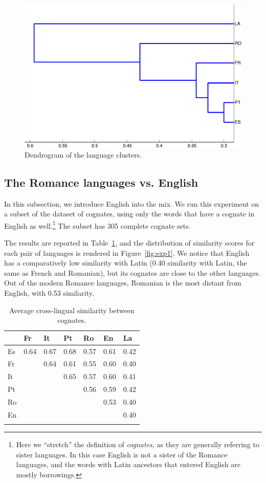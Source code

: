 \documentclass[output=paper]{langsci/langscibook}
\begin{document}
\begin{figure}[p]
\center
\includegraphics[width=0.8\linewidth]{figures/UBAN_dendrogram.pdf}
\caption{\label{fig:dendrogram_cognates}Dendrogram of the language clusters.}
\end{figure}

\subsection{The Romance languages vs. English}\largerpage

In this subsection, we introduce English into the mix. We run this experiment on a subset of the dataset of cognates, using only the words that have a cognate in English as well.\footnote{Here we ``stretch'' the definition of \emph{cognates}, as they are generally referring to sister languages. In this case English is not a sister of the Romance languages, and the words with Latin ancestors that entered English are mostly borrowings.} The subset has 305 complete cognate sets.

The results are reported in Table~\ref{table:cognate_similarity_en}, and the distribution of similarity scores for each pair of languages is rendered in Figure~\ref{fig:exp1}. We notice that English has a comparatively low similarity with Latin (0.40 similarity with Latin, the same as French and Romanian), but its cognates are close to the other languages. Out of the modern Romance languages, Romanian is the most distant from English, with 0.53 similarity.

\begin{table}[!ht]
\begin{center}
\begin{tabular}{l l l l l l l}
\lsptoprule
& Fr & It & Pt & Ro & En & La\\
\midrule

Es & 0.64 & 0.67 & 0.68 & 0.57 & 0.61 & 0.42 \\
Fr & & 0.64 & 0.61 & 0.55 & 0.60 & 0.40 \\
It & & & 0.65 & 0.57 & 0.60 & 0.41 \\
Pt & & & & 0.56 & 0.59 & 0.42 \\
Ro & & & & & 0.53 & 0.40 \\
En & & & & & & 0.40 \\
\lspbottomrule

\end{tabular}
\end{center}
\caption{\label{table:cognate_similarity_en}Average cross-lingual similarity between cognates.}
\end{table}
\end{document}
